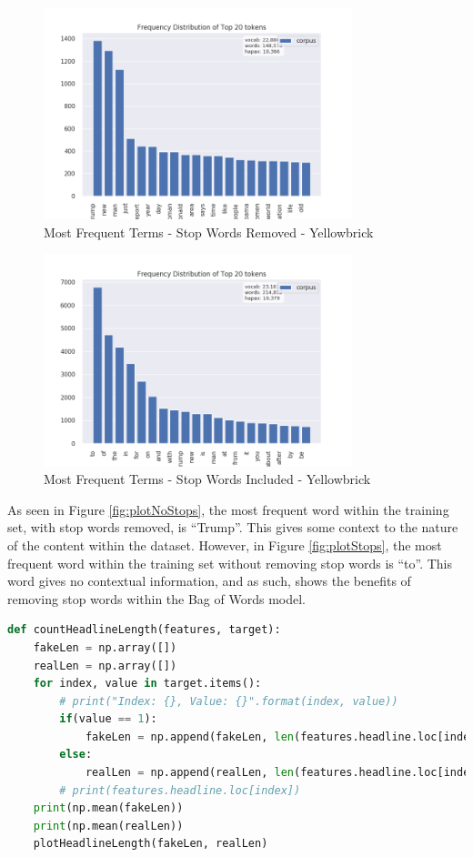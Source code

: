 \begin{figure}[H]
	\centering
	\includegraphics[width=0.8\textwidth]{images/SWRemovedYB}
	\caption{Most Frequent Terms - Stop Words Removed - Yellowbrick}
	\label{fig:plotNoStopsYB}
\end{figure}

\begin{figure}[H]
	\centering
	\includegraphics[width=0.8\textwidth]{images/SWIncludedYB}
	\caption{Most Frequent Terms - Stop Words Included - Yellowbrick}
	\label{fig:plotStopsYB}
\end{figure}

As seen in Figure \ref{fig:plotNoStops}, the most frequent word within the
training set, with stop words removed, is ``Trump''. This gives some context to
the nature of the content within the dataset. However, in Figure
\ref{fig:plotStops}, the most frequent word within the training set without
removing stop words is ``to''. This word gives no contextual information, and as
such, shows the benefits of removing stop words within the Bag of Words model.

\begin{lstlisting}[language=Python, caption={``countHeadlineLength'' Function},
label={lst:cntLength}]
def countHeadlineLength(features, target):
    fakeLen = np.array([])
    realLen = np.array([])
    for index, value in target.items():
        # print("Index: {}, Value: {}".format(index, value))
        if(value == 1):
            fakeLen = np.append(fakeLen, len(features.headline.loc[index]))
        else:
            realLen = np.append(realLen, len(features.headline.loc[index]))
        # print(features.headline.loc[index])
    print(np.mean(fakeLen))
    print(np.mean(realLen))
    plotHeadlineLength(fakeLen, realLen)
\end{lstlisting}

